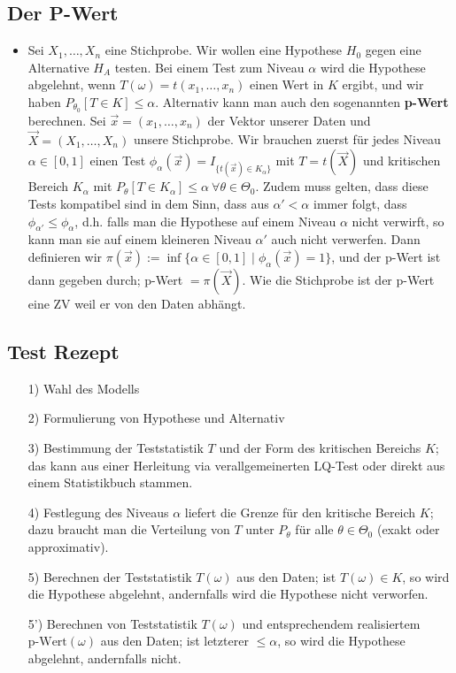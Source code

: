 \subsection{Der P-Wert}
\begin{itemize}
    \item Sei $X_1, \dots, X_n$ eine Stichprobe. Wir wollen eine Hypothese $H_0$ gegen eine Alternative $H_A$ testen. Bei einem Test zum Niveau $\alpha$ wird die Hypothese abgelehnt, wenn $T(\omega) = t(x_1, \dots, x_n)$ einen Wert in $K$ ergibt, und wir haben $P_{\theta_0} [T \in K] \le \alpha$. Alternativ kann man auch den sogenannten \textbf{p-Wert} berechnen. Sei $\overrightarrow{x} = (x_1, \dots, x_n)$ der Vektor unserer Daten und $\overrightarrow{X} = (X_1, \dots, X_n)$ unsere Stichprobe. Wir brauchen zuerst für jedes Niveau $\alpha \in [0, 1]$ einen Test $\phi_\alpha(\overrightarrow{x}) = I_{\{t(\overrightarrow{x}) \in K_\alpha\} }$ mit $T = t(\overrightarrow{X})$ und kritischen Bereich $K_\alpha$ mit $P_\theta[T \in K_\alpha] \le \alpha \ \forall \theta \in \Theta_0$. Zudem muss gelten, dass diese Tests kompatibel sind in dem Sinn, dass aus $\alpha' < \alpha$ immer folgt, dass $\phi_{\alpha'} \le \phi_\alpha$, d.h. falls man die Hypothese auf einem Niveau $\alpha$ nicht verwirft, so kann man sie auf einem kleineren Niveau $\alpha'$ auch nicht verwerfen. Dann definieren wir $\pi(\overrightarrow{x}) := \inf \{\alpha \in [0, 1] \mid \phi_\alpha(\overrightarrow{x}) = 1\}$, und der p-Wert ist dann gegeben durch; p-Wert $= \pi(\overrightarrow{X})$. Wie die Stichprobe ist der p-Wert eine ZV weil er von den Daten abhängt.
\end{itemize}

\subsection{Test Rezept}
\begin{itemize}[leftmargin=0.35cm]
    \item[1)] Wahl des Modells
    \item[2)] Formulierung von Hypothese und Alternativ
    \item[3)] Bestimmung der Teststatistik $T$ und der Form des kritischen Bereichs $K$; das kann aus einer Herleitung via verallgemeinerten LQ-Test oder direkt aus einem Statistikbuch stammen.
    \item[4)] Festlegung des Niveaus $\alpha$ liefert die Grenze für den kritische Bereich $K$; dazu braucht man die Verteilung von $T$ unter $P_\theta$ für alle $\theta \in \Theta_0$ (exakt oder approximativ).
    \item[5)] Berechnen der Teststatistik $T(\omega)$ aus den Daten; ist $T(\omega) \in K$, so wird die Hypothese abgelehnt, andernfalls wird die Hypothese nicht verworfen.
    \item[5')] Berechnen von Teststatistik $T(\omega)$ und entsprechendem realisiertem $\text{p-Wert}(\omega)$ aus den Daten; ist letzterer $\le \alpha$, so wird die Hypothese abgelehnt, andernfalls nicht.
\end{itemize}
